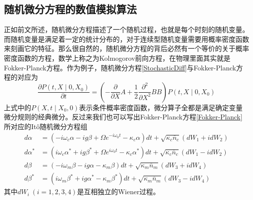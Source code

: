 \subsection{随机微分方程的数值模拟算法}
正如前文所述，随机微分方程描述了一个随机过程，也就是每个时刻的随机变量。而随机变量是满足着一定的统计分布的，对于连续型随机变量需要用概率密度函数来刻画它的特征。那么很自然的，随机微分方程的背后必然有一个等价的关于概率密度函数的方程，数学上称之为Kolmogorov前向方程，在物理里面其实就是Fokker-Planck方程。作为例子，随机微分方程\eqref{StochasticDiff}与Fokker-Planck方程的对应为
\begin{equation}
\frac{\partial P\left(t,X \mid 0,X_{0}\right)}{\partial t} = \left(-\frac{\partial}{\partial X} A+\frac{1}{2} \frac{\partial^{2}}{\partial X^2} BB\right) P\left(t,X \mid 0,X_{0}\right)
\end{equation}
上式中的$P\left(X, t \mid X_{0}, 0\right)$表示条件概率密度函数，微分算子全都是满足确定变量微分规则的经典微分。反过来我们也可以写出Fokker-Planck方程\eqref{Fokker-Planck}所对应的It\^o随机微分方程组
\begin{align}
d{{\alpha}}&=(-i\omega_{c}{\alpha}-ig{\beta}+\Omega e^{-i\omega_{0}t}-\kappa_{c}{\alpha})dt+\sqrt{\kappa_c\overline{n}_{c}}(dW_1+idW_2) \label{sdes1} \\
d{{\alpha^{*}}}&=(i\omega_{c}{\alpha^{*}}+ig{\beta^{*}}+\Omega e^{i\omega_{0}t}-\kappa_{c}{\alpha^{*}})dt+\sqrt{\kappa_c\overline{n}_{c}}(dW_1-idW_2) \\
d{{\beta}}&=(-i\omega_{m}{\beta}-ig{\alpha}-\kappa_{m}{\beta})dt+\sqrt{\kappa_m\overline{n}_{m}}(dW_3+idW_4) \\
d{{\beta^{*}}}&=(i\omega_{m}{\beta^{*}}+ig{\alpha^{*}}-\kappa_{m}{\beta^{*}})dt+\sqrt{\kappa_m\overline{n}_{m}}(dW_3-idW_4) \label{sdes4}
\end{align}
其中$dW_i~(i=1,2,3,4)$是互相独立的Wiener过程。

